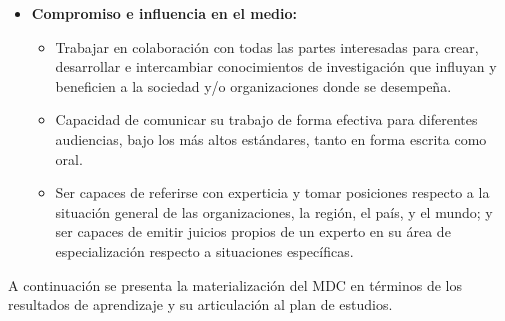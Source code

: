 \begin{tcolorbox}[breakable,colback=blue!5!white,colframe=blue!75!black,title=Perfil de egreso]
\begin{itemize}
\begin{itemize}
      \end{itemize}
      
          \item \textbf{Compromiso e influencia en el medio: }
      \begin{itemize}
          \item Trabajar en colaboración con todas las partes interesadas para crear, desarrollar e intercambiar conocimientos de investigación que influyan y beneficien a la sociedad y/o organizaciones donde se desempeña.
          \item Capacidad de comunicar su trabajo de forma efectiva para diferentes audiencias, bajo los más altos estándares, tanto en forma escrita como oral.
          \item Ser capaces de referirse con experticia y tomar posiciones respecto a la situación general de las organizaciones, la región, el país, y el mundo; y ser capaces de emitir juicios propios de un experto en su área de especialización respecto a situaciones específicas. 
      \end{itemize}
  \end{itemize}

\end{tcolorbox}

A continuación se presenta la materialización del MDC en términos de los resultados de aprendizaje y su articulación al plan de estudios.